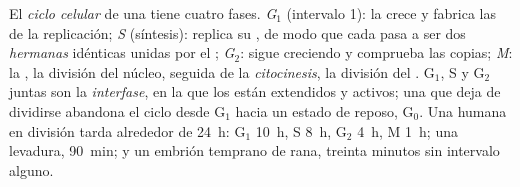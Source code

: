 \begin{definition}\label{def:b1:replication-mitosis:cycle}
El \emph{ciclo celular} de una  tiene cuatro fases.
\emph{G$_1$} (intervalo 1): la  crece y fabrica las  de la
replicación; \emph{S} (síntesis): replica su , de modo que cada 
pasa a ser dos \emph{ hermanas} idénticas unidas por el
; \emph{G$_2$}: sigue creciendo y comprueba las copias; \emph{M}:
la \emph{}, la división del núcleo, seguida de la
\emph{citocinesis}, la división del . G$_1$, S y G$_2$ juntas son
la \emph{interfase}, en la que los  están extendidos y activos;
una  que deja de dividirse abandona el ciclo desde G$_1$ hacia un
estado de reposo, G$_0$. Una  humana en división tarda alrededor de
\qty{24}{h}: G$_1$ \qty{10}{h}, S \qty{8}{h}, G$_2$ \qty{4}{h}, M
\qty{1}{h}; una levadura, \qty{90}{min}; y un embrión temprano de rana,
treinta minutos sin intervalo alguno.
\end{definition}

